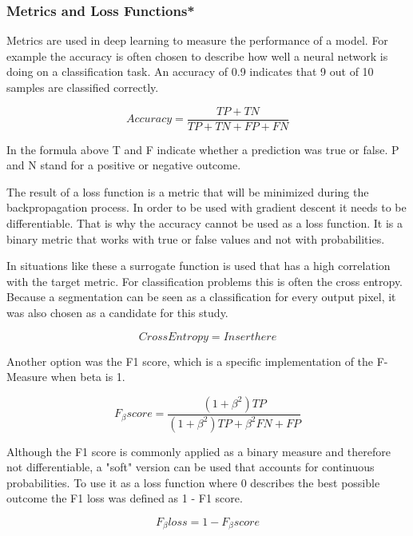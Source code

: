 \subsubsection{Metrics and Loss Functions*}

Metrics are used in deep learning to measure the performance of a model. For example the accuracy is often chosen to describe how well a neural network is doing on a classification task. An accuracy of 0.9 indicates that 9 out of 10 samples are classified correctly.

\begin{equation}
Accuracy = \frac{TP+TN}{TP+TN+FP+FN}
\end{equation}

In the formula above T and F indicate whether a prediction was true or false. P and N stand for a positive or negative outcome.

The result of a loss function is a metric that will be minimized during the backpropagation process. In order to be used with gradient descent it needs to be differentiable. That is why the accuracy cannot be used as a loss function. It is a binary metric that works with true or false values and not with probabilities.

In situations like these a surrogate function is used that has a high correlation with the target metric. For classification problems this is often the cross entropy. Because a segmentation can be seen as a classification for every output pixel, it was also chosen as a candidate for this study.

\begin{equation}
Cross Entropy = Insert here
\end{equation}

Another option was the F1 score, which is a specific implementation of the F-Measure when beta is 1. 

\begin{equation}
F_\beta score= \frac{(1 + \beta^2) TP}{(1+\beta^2)TP+\beta^2FN+FP}
\end{equation}

Although the F1 score is commonly applied as a binary measure and therefore not differentiable, a "soft" version can be used that accounts for continuous probabilities. To use it as a loss function where 0 describes the best possible outcome the F1 loss was defined as 1 - F1 score.

\begin{equation}
F_\beta loss = 1 - F_\beta score
\end{equation}

